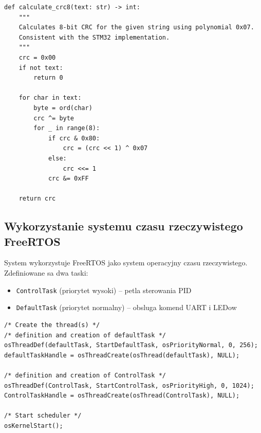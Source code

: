 \documentclass[11pt]{article}
\begin{document}
\begin{lstlisting}[caption={Implementacja CRC-8 w Pythonie (utils/crc8.py)}, style=pythonstyle]
def calculate_crc8(text: str) -> int:
    """
    Calculates 8-bit CRC for the given string using polynomial 0x07.
    Consistent with the STM32 implementation.
    """
    crc = 0x00
    if not text:
        return 0
        
    for char in text:
        byte = ord(char)
        crc ^= byte
        for _ in range(8):
            if crc & 0x80:
                crc = (crc << 1) ^ 0x07
            else:
                crc <<= 1
            crc &= 0xFF
            
    return crc
\end{lstlisting}

\subsection{Wykorzystanie systemu czasu rzeczywistego FreeRTOS}

System wykorzystuje FreeRTOS jako system operacyjny czasu rzeczywistego. Zdefiniowane sa dwa taski:
\begin{itemize}
    \item \texttt{ControlTask} (priorytet wysoki) -- petla sterowania PID
    \item \texttt{DefaultTask} (priorytet normalny) -- obsluga komend UART i LEDow
\end{itemize}

\begin{lstlisting}[caption={Tworzenie taskow FreeRTOS (main.c)}, style=cstyle]
/* Create the thread(s) */
/* definition and creation of defaultTask */
osThreadDef(defaultTask, StartDefaultTask, osPriorityNormal, 0, 256);
defaultTaskHandle = osThreadCreate(osThread(defaultTask), NULL);

/* definition and creation of ControlTask */
osThreadDef(ControlTask, StartControlTask, osPriorityHigh, 0, 1024);
ControlTaskHandle = osThreadCreate(osThread(ControlTask), NULL);

/* Start scheduler */
osKernelStart();
\end{lstlisting}
\end{document}
